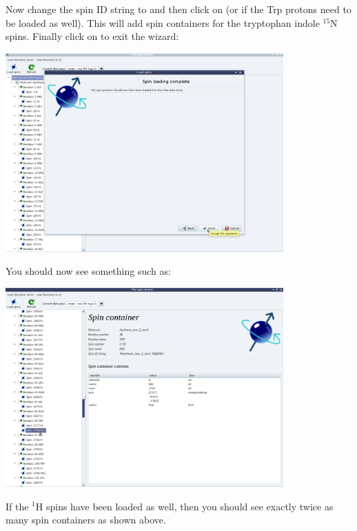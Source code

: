 Now change the spin ID string to  and then click on  (or  if the Trp protons  need to be loaded as well).  This will add spin containers for the tryptophan indole $^{15}$N spins.  Finally click on  to exit the wizard:

\begin{minipage}[h]{\linewidth}
\centerline{\includegraphics[width=0.8\textwidth, bb=14 14 1415 1019]{graphics/screenshots/spin_viewer/wizard_end}}
\label{figure: spin viewer end}
\end{minipage}

You should now see something such as:

\begin{minipage}[h]{\linewidth}
\centerline{\includegraphics[width=0.8\textwidth, bb=14 14 1415 1019]{graphics/screenshots/spin_viewer/full}}
\end{minipage}

If the $^1$H spins have been loaded as well, then you should see exactly twice as many spin containers as shown above.


